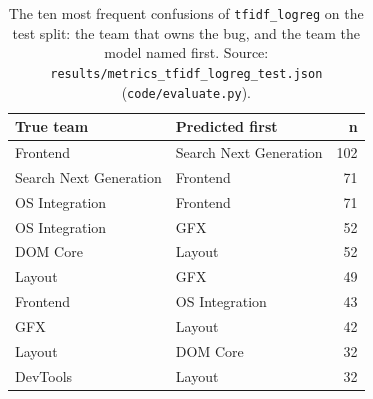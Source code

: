\begin{table}[t]\centering
\small
\caption{The ten most frequent confusions of \texttt{tfidf\_logreg} on the test split: the team that owns the bug, and the team the model named first. Source: \texttt{results/metrics\_tfidf\_logreg\_test.json} (\texttt{code/evaluate.py}).}
\label{tab:confusions-test}
\begin{tabular}{llr}
\toprule
True team & Predicted first & n \\
\midrule
Frontend & Search Next Generation & 102 \\
Search Next Generation & Frontend & 71 \\
OS Integration & Frontend & 71 \\
OS Integration & GFX & 52 \\
DOM Core & Layout & 52 \\
Layout & GFX & 49 \\
Frontend & OS Integration & 43 \\
GFX & Layout & 42 \\
Layout & DOM Core & 32 \\
DevTools & Layout & 32 \\
\bottomrule
\end{tabular}
\end{table}
